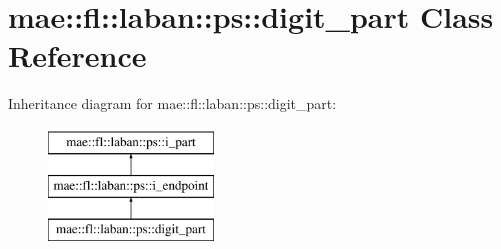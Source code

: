\hypertarget{classmae_1_1fl_1_1laban_1_1ps_1_1digit__part}{\section{mae\-:\-:fl\-:\-:laban\-:\-:ps\-:\-:digit\-\_\-part Class Reference}
\label{classmae_1_1fl_1_1laban_1_1ps_1_1digit__part}
}
Inheritance diagram for mae\-:\-:fl\-:\-:laban\-:\-:ps\-:\-:digit\-\_\-part\-:\begin{figure}[H]
\begin{center}
\leavevmode
\includegraphics[height=3.000000cm]{classmae_1_1fl_1_1laban_1_1ps_1_1digit__part}
\end{center}
\end{figure}
